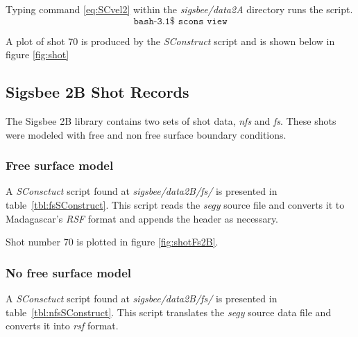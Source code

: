 Typing command \ref{eq:SCvel2} within the \emph{sigsbee/data2A} directory runs the script.
\begin{equation}\label{eq:SCvel2} \texttt{bash-3.1\$\ scons\ view} \end{equation}

A plot of shot 70  is produced by the \emph{SConstruct} script and is shown below in figure \ref{fig:shot}


\subsection{Sigsbee 2B Shot Records}
The Sigsbee 2B library contains two sets of shot data, \emph{nfs} and \emph{fs}.  These shots were modeled with free and non free surface boundary conditions.  

\subsubsection{Free surface model}  
A \emph{SConsctuct} script found at \textit{sigsbee/data2B/fs/} is presented in table~\ref{tbl:fsSConstruct}.  
This script reads the \emph{segy} source file and converts it to Madagascar's \emph{RSF} format and appends the header as 
necessary. 

{
\tiny

\normalsize
}


Shot number 70 is plotted in figure \ref{fig:shotFs2B}.   


\subsubsection{No free surface model}
A \emph{SConsctuct} script found at \textit{sigsbee/data2B/fs/} is presented in table~\ref{tbl:nfsSConstruct}.  This script 
translates the \emph{segy} source data file and converts it into \emph{rsf} format.  

{
\tiny

\normalsize
}


